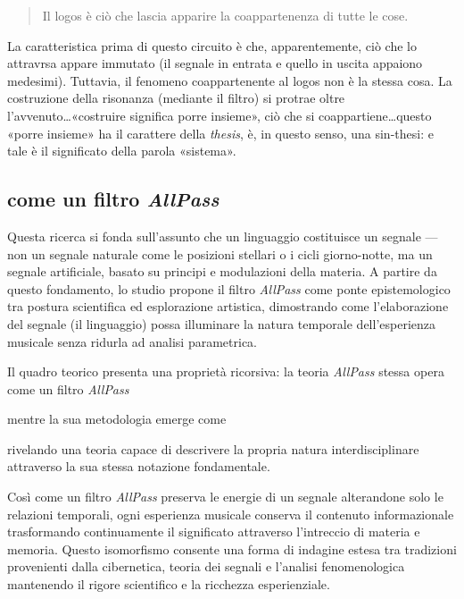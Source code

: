 \begin{quote}
  \begin{sf}
    \small
    Il logos è ciò che lascia apparire la coappartenenza di tutte le cose.
  \end{sf}
\end{quote}

La caratteristica prima di questo circuito è che, apparentemente, ciò che lo
attravrsa appare immutato (il segnale in entrata e quello in uscita appaiono
medesimi). Tuttavia, il fenomeno coappartenente al logos non è la stessa cosa.
La costruzione della risonanza (mediante il filtro) si protrae oltre
l'avvenuto\ldots «costruire significa porre insieme», ciò che si
coappartiene\ldots questo «porre insieme» ha il carattere della \emph{thesis},
è, in questo senso, una sin-thesi: e tale è il significato della parola «sistema».


\subsection{come un filtro \emph{AllPass}}

Questa ricerca si fonda sull'assunto che un linguaggio costituisce un segnale — non un segnale naturale come le posizioni stellari o i cicli giorno-notte, ma un segnale artificiale, basato su principi e modulazioni della materia. A partire da questo fondamento, lo studio propone il filtro \emph{AllPass} come ponte epistemologico tra postura scientifica ed esplorazione artistica, dimostrando come l'elaborazione del segnale (il linguaggio) possa illuminare la natura temporale dell'esperienza musicale senza ridurla ad analisi parametrica.

Il quadro teorico presenta una proprietà ricorsiva: la teoria \emph{AllPass} stessa opera come un filtro \emph{AllPass}


\noindent mentre la sua metodologia emerge come


rivelando una teoria capace di descrivere la propria natura interdisciplinare attraverso la sua stessa notazione fondamentale.

Così come un filtro \emph{AllPass} preserva le energie di un segnale alterandone solo le relazioni temporali, ogni esperienza musicale conserva il contenuto informazionale trasformando continuamente il significato attraverso l'intreccio di materia e memoria. Questo isomorfismo consente una forma di indagine estesa tra tradizioni provenienti dalla cibernetica, teoria dei segnali e l'analisi fenomenologica mantenendo il rigore scientifico e la ricchezza esperienziale.

